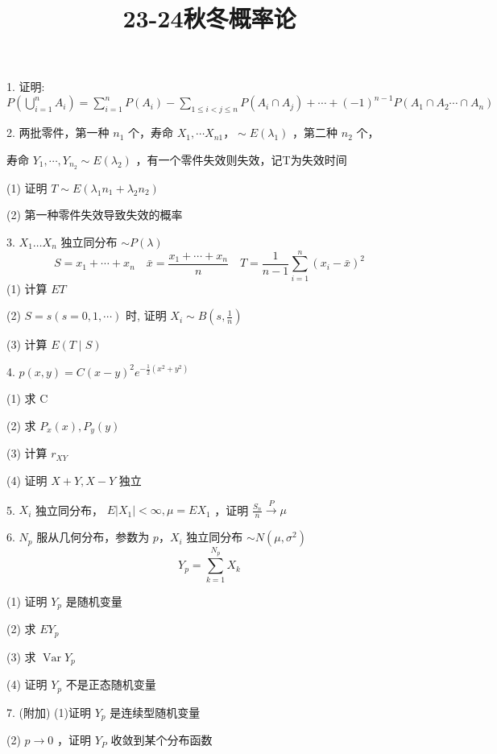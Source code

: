 \documentclass[12pt, a4paper, oneside]{ctexart}
\title{\huge\textbf{23-24秋冬概率论}}
\begin{document}
\maketitle

1. 证明: $P\left(\bigcup_{i=1}^n A_i\right)=\sum_{i=1}^n P\left(A_i\right)-\sum_{1 \leq i<j \leqslant n} P\left(A_i \cap A_j\right)+\cdots+(-1)^{n-1} P\left(A_1 \cap A_2 \cdots \cap A_n\right)$

2. 两批零件，第一种 $n_1$ 个，寿命 $X_1, \cdots X_{n 1} ， \sim E\left(\lambda_1\right)$ ，第二种 $n_2$ 个，

寿命 $Y_1, \cdots, Y_{n_2} \sim E\left(\lambda_2\right)$ ，有一个零件失效则失效，记T为失效时间

    (1) 证明 $T \sim E\left(\lambda_1 n_1+\lambda_2 n_2\right)$
    
    (2) 第一种零件失效导致失效的概率

3. $X_1 \ldots X_n$ 独立同分布 $\sim P(\lambda)$
$$
S=x_1+\cdots+x_n \quad \bar{x}=\frac{x_1+\cdots+x_n}{n} \quad T=\frac{1}{n-1} \sum_{i=1}^n\left(x_i-\bar{x}\right)^2
$$
    (1) 计算 $ET$

    (2) $S=s(s=0,1, \cdots)$ 时, 证明 $X_i \sim B\left(s, \frac{1}{n}\right)$
    
    (3) 计算 $E(T \mid S)$

4. $p(x, y)=C(x-y)^2 e^{-\frac{1}{2}\left(x^2+y^2\right)}$

    (1) 求 C

    (2) 求 $P_x(x), P_y(y)$

    (3) 计算 $r_{X Y}$

    (4) 证明 $X+Y, X-Y$ 独立

5. $X_i$ 独立同分布， $E\left|X_1\right|<\infty, \mu=E X_1$ ，证明 $\frac{S_n}{n} \stackrel{P}{\rightarrow} \mu$

6. $N_p$ 服从几何分布，参数为 $p ， X_i$ 独立同分布 $\sim N\left(\mu, \sigma^2\right)$
$$
Y_p=\sum_{k=1}^{N_p} X_k
$$

    (1) 证明 $Y_p$ 是随机变量

    (2) 求 $E Y_p$

    (3) 求 $\operatorname{Var} Y_p$

    (4) 证明 $Y_p$ 不是正态随机变量

7. (附加) (1)证明 $Y_p$ 是连续型随机变量

(2) $p \rightarrow 0$ ，证明 $Y_P$ 收敛到某个分布函数
\end{document}
